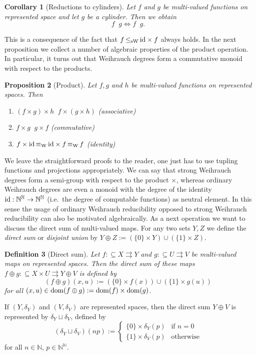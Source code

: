 \documentclass[jsl,10pt]{noasl}
\def\IN{{\mathbb{N}}}
\def\In{\subseteq}
\def\mto{\rightrightarrows}
\def\id{{\rm id}}
\def\dom{{\rm dom}}
\def\leqW{\mathop{\leq_{\mathrm{W}}}}
\def\equivW{\mathop{\equiv_{\mathrm{W}}}}
\def\leqSW{\mathop{\leq_{\mathrm{sW}}}}
\def\equivSW{\mathop{\equiv_{\mathrm{sW}}}}
\newtheorem{proposition}{Proposition}[section]
\newtheorem{definition}[proposition]{Definition}
\newtheorem{corollary}[proposition]{Corollary}
\begin{document}
\begin{corollary}[Reductions to cylinders]
\label{cor:cylinder-reduction}
Let $f$ and $g$ be multi-valued functions on represented space
and let $g$ be a cylinder.
Then we obtain 
\[f\leqW g\iff f\leqSW g.\]
\end{corollary}

This is a consequence of the fact that $f\leqSW\id\times f$ always holds.
In the next proposition we collect
a number of algebraic properties of the product operation.
In particular, it turns out that Weihrauch degrees form a commutative
monoid with respect to the products.

\begin{proposition}[Product]
\label{prop:product}
Let $f,g$ and $h$ be multi-valued functions on represented spaces. Then
\begin{enumerate}
\item $(f\times g)\times h\equivSW f\times(g\times h)$ \hfill (associative)
\item $f\times g\equivSW g\times f$ \hfill (commutative)
\item $f\times\id\equivW\id\times f\equivW f$ \hfill (identity)
\end{enumerate}
\end{proposition}

We leave the straightforward proofs to the reader, one just has to use
tupling functions and projections appropriately.
We can say that strong Weihrauch degrees form a semi-group with
respect to the product $\times$, whereas ordinary Weihrauch degrees
are even a monoid with the degree of the identity $\id:\IN^\IN\to\IN^\IN$ (i.e.\
the degree of computable functions) as neutral element.
In this sense the usage of ordinary Weihrauch reducibility 
opposed to strong Weihrauch reducibility can also be motivated algebraically.
As a next operation we want to discuss the direct sum of multi-valued maps.
For any two sets $Y,Z$ we define the {\it direct sum} or {\it disjoint union} by
$Y\oplus Z:=(\{0\}\times Y)\cup(\{1\}\times Z)$.

\begin{definition}[Direct sum]\rm
Let $f:\In X\mto Y$ and $g:\In U\mto V$ be multi-valued maps on represented spaces.
Then the {\em direct sum} of these maps $f\oplus g:\In X\times U\mto Y\oplus V$ is defined by
\[(f\oplus g)(x,u):=(\{0\}\times f(x))\cup(\{1\}\times g(u))\]
for all $(x,u)\in\dom(f\oplus g):=\dom(f)\times\dom(g)$.
\end{definition}

If $(Y,\delta_Y)$ and $(V,\delta_V)$ are represented spaces, then the
direct sum $Y\oplus V$ is represented by $\delta_Y\sqcup\delta_V$, defined 
by 
\[(\delta_Y\sqcup\delta_V)(np):=\left\{\begin{array}{ll}
  \{0\}\times\delta_Y(p) & \mbox{if $n=0$}\\
  \{1\}\times\delta_V(p) & \mbox{otherwise}
\end{array}\right.\]
for all $n\in\IN$, $p\in\IN^\IN$.
\end{document}
